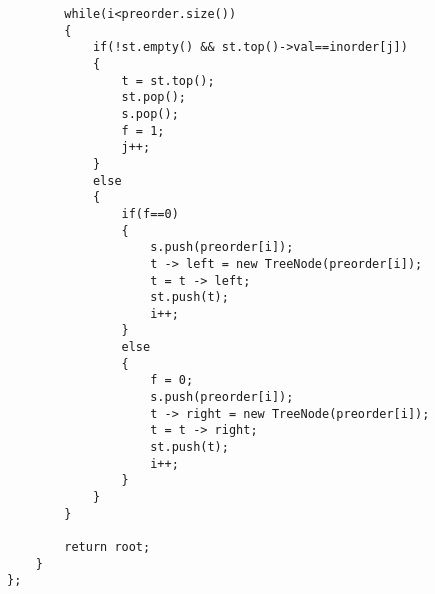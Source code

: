 \begin{description}
\begin{lstlisting}
        while(i<preorder.size())
        {
            if(!st.empty() && st.top()->val==inorder[j])
            {
                t = st.top();
                st.pop();
                s.pop();
                f = 1;
                j++;
            }
            else
            {
                if(f==0)
                {
                    s.push(preorder[i]);
                    t -> left = new TreeNode(preorder[i]);
                    t = t -> left;
                    st.push(t);
                    i++;
                }
                else 
                {
                    f = 0;
                    s.push(preorder[i]);
                    t -> right = new TreeNode(preorder[i]);
                    t = t -> right;
                    st.push(t);
                    i++;
                }
            }
        }

        return root;
    }
};
		\end{lstlisting}

\end{description}

